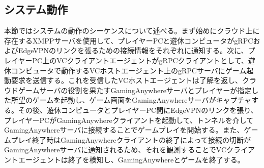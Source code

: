 \subsection{システム動作}
本節ではシステムの動作のシーケンスについて述べる。まず始めにクラウド上に存在するXMPPサーバを使用して、プレイヤーPCと遊休コンピュータがgRPCおよびEdgeVPNのリンクを張るための接続情報をそれぞれに通知する。次に、プレイヤーPC上のVCクライアントエージェントがgRPCクライアントとして、遊休コンピュータで動作するVCホストエージェント上のgRPCサーバにゲーム起動要求を送信する。これを受信したVCホストエージェントは了解を返し、クラウドゲームサーバの役割を果たすGamingAnywhereサーバとプレイヤーが指定した所望のゲームを起動し、ゲーム画面をGamingAnywhereサーバがキャプチャする。その後、遊休コンピュータとプレイヤーPC間にEdgeVPNのリンクを張り、プレイヤーPCがGamingAnywhereクライアントを起動して、トンネルを介してGamingAnywhereサーバに接続することでゲームプレイを開始する。また、ゲームプレイ終了時はGamingAnywhereクライアントの終了によって接続の切断がGamingAnywhereサーバに通知されるため、それを観測することでVCクライアントエージェントは終了を検知し、GamingAnywhereとゲームを終了する。
